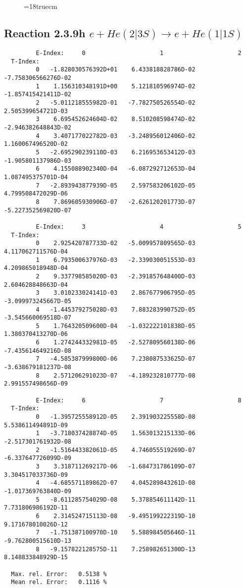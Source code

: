 \begin{figure} \label{2.3.9g}
\epsfxsize=18truecm
\end{figure}
\newpage

\subsection{
Reaction 2.3.9h  $e + He(2|3S) \rightarrow e + He(1|1S) $
}


\begin{verbatim}
         E-Index:     0                     1                     2
  T-Index:
         0   -1.828030576392D+01    6.433818828786D-02   -7.758306566276D-02
         1    1.156310348191D+00    5.121810596974D-02   -1.857415421411D-02
         2   -5.011218555982D-01   -7.782750526554D-02    2.505399654721D-03
         3    6.695452624604D-02    8.510208598474D-02   -2.946382648843D-02
         4    3.407177022782D-03   -3.248956012406D-02    1.160067496520D-02
         5   -2.695290239110D-03    6.216953653412D-03   -1.905801137986D-03
         6    4.155088902340D-04   -6.087292712653D-04    1.087495375701D-04
         7   -2.893943877939D-05    2.597583206102D-05    4.799508472029D-06
         8    7.869605930906D-07   -2.626120201773D-07   -5.227352569820D-07

         E-Index:     3                     4                     5
  T-Index:
         0    2.925420787733D-02   -5.009957809565D-03    4.117062711576D-04
         1    6.793500637976D-03   -2.339030051553D-03    4.209865018948D-04
         2    9.337798585020D-03   -2.391857648400D-03    2.604628848663D-04
         3    3.010233024141D-03    2.867677906795D-05   -3.099973245667D-05
         4   -1.445379275028D-03    7.883283990752D-05   -3.545660069518D-07
         5    1.764320509600D-04   -1.032222101838D-05    1.380370413270D-06
         6    1.274244332981D-05   -2.527809560138D-06   -7.435614649216D-08
         7   -4.585387999800D-06    7.238087533625D-07   -3.638679181237D-08
         8    2.571206291023D-07   -4.189232810777D-08    2.991557498656D-09

         E-Index:     6                     7                     8
  T-Index:
         0   -1.395725558912D-05    2.391903225558D-08    5.538611494891D-09
         1   -3.718037428874D-05    1.563013215133D-06   -2.517301761932D-08
         2   -1.516443382061D-05    4.746055519269D-07   -6.337647726099D-09
         3    3.318711269217D-06   -1.684731786109D-07    3.304517033736D-09
         4   -4.685571189862D-07    4.045289843261D-08   -1.017369763840D-09
         5   -8.611285754029D-08    5.378854611142D-11    7.731806986192D-11
         6    2.314524715113D-08   -9.495199222319D-10    9.171678010026D-12
         7   -1.751387100970D-10    5.588984505646D-11   -9.762800515610D-13
         8   -9.157822128575D-11    7.258982651300D-13    8.148833848929D-15

  Max. rel. Error:   0.5138 %
  Mean rel. Error:   0.1116 %


\end{verbatim}

